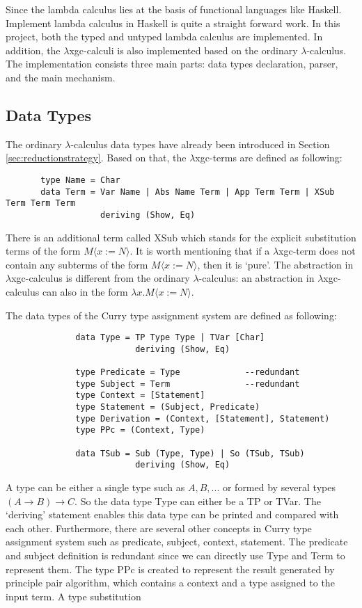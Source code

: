 Since the lambda calculus lies at the basis of functional languages like Haskell. Implement lambda calculus in Haskell is quite a straight forward work. In this project, both the typed and untyped lambda calculus are implemented. In addition, the $\lambda$xgc-calculi is also implemented based on the ordinary $\lambda$-calculus. The implementation consists three main parts: data types declaration, parser, and the main mechanism.

\subsection{Data Types}

The ordinary $\lambda$-calculus data types have already been introduced in Section \ref{sec:reductionstrategy}. Based on that, the $\lambda$xgc-terms are defined as following: 
\begin{verbatim}
       type Name = Char  
       data Term = Var Name | Abs Name Term | App Term Term | XSub Term Term Term
                   deriving (Show, Eq)
\end{verbatim}
There is an additional term called \textsf{XSub} which stands for the explicit substitution terms of the form $M\langle x := N\rangle$. It is worth mentioning that if a $\lambda$xgc-term does not contain any subterms of the form $M\langle x := N\rangle$, then it is `pure'. The abstraction in $\lambda$xgc-calculus is different from the ordinary $\lambda$-calculus: an abstraction in $\lambda$xgc-calculus can also in the form $\lambda x.M\langle x := N\rangle$.

The data types of the Curry type assignment system are defined as following:
\begin{verbatim}
              data Type = TP Type Type | TVar [Char]
                          deriving (Show, Eq)
            
              type Predicate = Type             --redundant  
              type Subject = Term               --redundant 
              type Context = [Statement]
              type Statement = (Subject, Predicate)
              type Derivation = (Context, [Statement], Statement)
              type PPc = (Context, Type)

              data TSub = Sub (Type, Type) | So (TSub, TSub)
                          deriving (Show, Eq)
\end{verbatim}

A type can be either a single type such as $A, B,...$ or formed by several types $(A\rightarrow B)\rightarrow C$. So the data type \textsf{Type} can either be a \textsf{TP} or \textsf{TVar}. The `deriving' statement enables this data type can be printed and compared with each other. Furthermore, there are several other concepts in Curry type assignment system such as \textsf{predicate, subject, context, statement}. The \textsf{predicate} and \textsf{subject} definition is redundant since we can directly use \textsf{Type} and \textsf{Term} to represent them. The type PPc is created to represent the result generated by principle pair algorithm, which contains a context and a type assigned to the input term. A type substitution   



